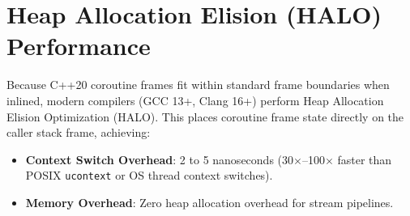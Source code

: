 \section{Heap Allocation Elision (HALO) Performance}
Because C++20 coroutine frames fit within standard frame boundaries when inlined, modern compilers (GCC 13+, Clang 16+) perform Heap Allocation Elision Optimization (HALO). This places coroutine frame state directly on the caller stack frame, achieving:
\begin{itemize}
    \item \textbf{Context Switch Overhead}: 2 to 5 nanoseconds (30$\times$--100$\times$ faster than POSIX \texttt{ucontext} or OS thread context switches).
    \item \textbf{Memory Overhead}: Zero heap allocation overhead for stream pipelines.
\end{itemize}
